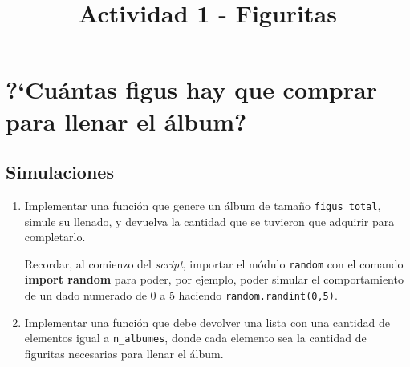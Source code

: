 \documentclass[a4paper,11pt]{article}
\title{Actividad 1 - Figuritas }
\begin{document}
	\maketitle
	\section*{?`Cu\'antas figus hay que comprar para llenar el \'album?}
	\subsection*{Simulaciones}

	\begin{enumerate}
		\item Implementar una funci\'on  que genere un \'album de tama\~no \lstinline{figus_total}, 
		simule su llenado, y devuelva la cantidad \fi que se tuvieron que adquirir para completarlo.
	
		Recordar, al comienzo del \textit{script}, importar el m\'odulo \texttt{random} con el comando \textbf{import random} para poder, por ejemplo, poder simular el comportamiento de un dado numerado de 0 a 5 haciendo \lstinline{random.randint(0,5)}.
		\ifb
			\item Implementar una funci\'on que debe devolver una lista con una cantidad de elementos igual a \lstinline{n_albumes}, donde cada elemento sea la cantidad de figuritas 
		necesarias para llenar el álbum\fi.
		\fi
	\end{enumerate}
\end{document}
